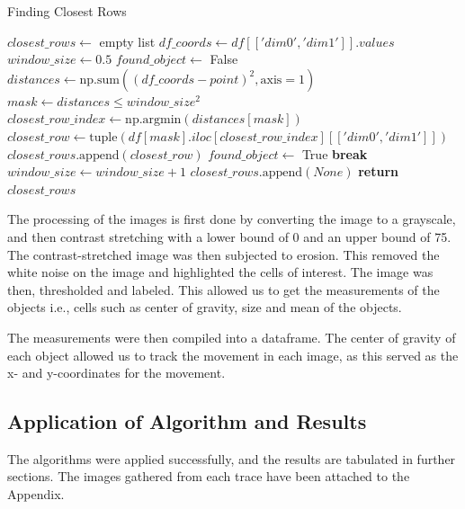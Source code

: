 \documentclass{article}
\begin{document}
\begin{algorithm}[h!]
\caption{Finding Closest Rows}\label{algo:find-closest-rows}
\begin{algorithmic}[1]
    \State $closest\_rows \gets$ empty list
    \State $df\_coords \gets df[['dim0', 'dim1']].values$
        \State $window\_size \gets 0.5$
        \State $found\_object \gets$ False
            \State $distances \gets \text{np.sum}((df\_coords - point)^2, \text{axis}=1)$
            \State $mask \gets distances \leq window\_size^2$
                \State $closest\_row\_index \gets \text{np.argmin}(distances[mask])$
                \State $closest\_row \gets \text{tuple}(df[mask].iloc[closest\_row\_index][['dim0', 'dim1']])$
                \State $closest\_rows.\text{append}(closest\_row)$
                \State $found\_object \gets$ True
                \State \textbf{break}
            \EndIf
            \State $window\_size \gets window\_size + 1$
        \EndWhile
            \State $closest\_rows.\text{append}(None)$  
        \EndIf
    \EndFor
    \State \textbf{return} $closest\_rows$
\EndFunction
\end{algorithmic}
\end{algorithm}
\par The processing of the images is first done by converting the image to a grayscale, and then contrast stretching with a lower bound of 0 and an upper bound of 75. The contrast-stretched image was then subjected to erosion. This removed the white noise on the image and highlighted the cells of interest. The image was then, thresholded and labeled. This allowed us to get the measurements of the objects i.e., cells such as center of gravity, size and mean of the objects. 
\par The measurements were then compiled into a dataframe. The center of gravity of each object allowed us to track the movement in each image, as this served as the x- and y-coordinates for the movement. 
\subsection*{Application of Algorithm and Results}
The algorithms were applied successfully, and the results are tabulated in further sections. The images gathered from each trace have been attached to the Appendix. 
\newpage
\end{document}
